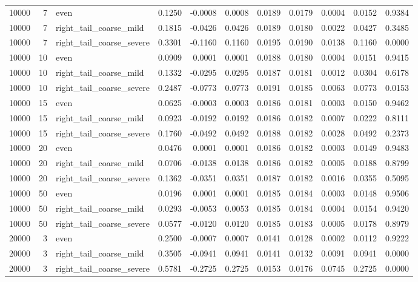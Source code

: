 \begin{table}[!h]
{\begin{tabular}[t]{rrlrrrrrrrr}
10000 & 7 & even & 0.1250 & -0.0008 & 0.0008 & 0.0189 & 0.0179 & 0.0004 & 0.0152 & 0.9384\\
10000 & 7 & right\_tail\_coarse\_mild & 0.1815 & -0.0426 & 0.0426 & 0.0189 & 0.0180 & 0.0022 & 0.0427 & 0.3485\\
10000 & 7 & right\_tail\_coarse\_severe & 0.3301 & -0.1160 & 0.1160 & 0.0195 & 0.0190 & 0.0138 & 0.1160 & 0.0000\\
10000 & 10 & even & 0.0909 & 0.0001 & 0.0001 & 0.0188 & 0.0180 & 0.0004 & 0.0151 & 0.9415\\
10000 & 10 & right\_tail\_coarse\_mild & 0.1332 & -0.0295 & 0.0295 & 0.0187 & 0.0181 & 0.0012 & 0.0304 & 0.6178\\
10000 & 10 & right\_tail\_coarse\_severe & 0.2487 & -0.0773 & 0.0773 & 0.0191 & 0.0185 & 0.0063 & 0.0773 & 0.0153\\
10000 & 15 & even & 0.0625 & -0.0003 & 0.0003 & 0.0186 & 0.0181 & 0.0003 & 0.0150 & 0.9462\\
10000 & 15 & right\_tail\_coarse\_mild & 0.0923 & -0.0192 & 0.0192 & 0.0186 & 0.0182 & 0.0007 & 0.0222 & 0.8111\\
10000 & 15 & right\_tail\_coarse\_severe & 0.1760 & -0.0492 & 0.0492 & 0.0188 & 0.0182 & 0.0028 & 0.0492 & 0.2373\\
10000 & 20 & even & 0.0476 & 0.0001 & 0.0001 & 0.0186 & 0.0182 & 0.0003 & 0.0149 & 0.9483\\
10000 & 20 & right\_tail\_coarse\_mild & 0.0706 & -0.0138 & 0.0138 & 0.0186 & 0.0182 & 0.0005 & 0.0188 & 0.8799\\
10000 & 20 & right\_tail\_coarse\_severe & 0.1362 & -0.0351 & 0.0351 & 0.0187 & 0.0182 & 0.0016 & 0.0355 & 0.5095\\
10000 & 50 & even & 0.0196 & 0.0001 & 0.0001 & 0.0185 & 0.0184 & 0.0003 & 0.0148 & 0.9506\\
10000 & 50 & right\_tail\_coarse\_mild & 0.0293 & -0.0053 & 0.0053 & 0.0185 & 0.0184 & 0.0004 & 0.0154 & 0.9420\\
10000 & 50 & right\_tail\_coarse\_severe & 0.0577 & -0.0120 & 0.0120 & 0.0185 & 0.0183 & 0.0005 & 0.0178 & 0.8979\\
20000 & 3 & even & 0.2500 & -0.0007 & 0.0007 & 0.0141 & 0.0128 & 0.0002 & 0.0112 & 0.9222\\
20000 & 3 & right\_tail\_coarse\_mild & 0.3505 & -0.0941 & 0.0941 & 0.0141 & 0.0132 & 0.0091 & 0.0941 & 0.0000\\
20000 & 3 & right\_tail\_coarse\_severe & 0.5781 & -0.2725 & 0.2725 & 0.0153 & 0.0176 & 0.0745 & 0.2725 & 0.0000\\

\end{tabular}}
\end{table}
